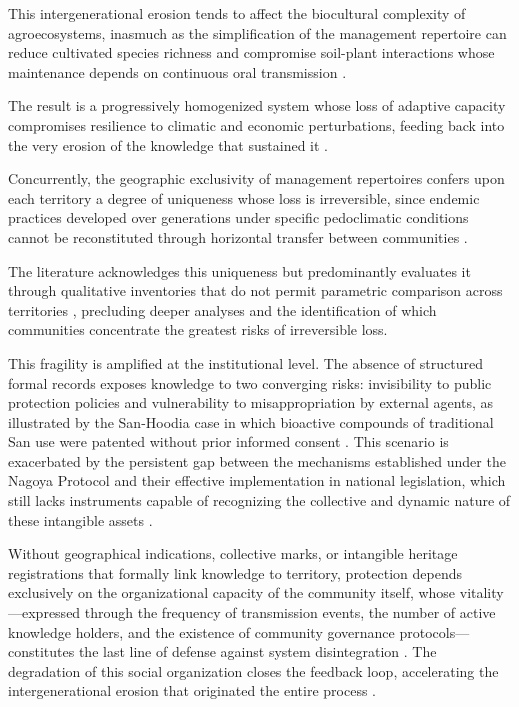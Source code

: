 \documentclass[12pt,a4paper]{article}
\begin{document}
This intergenerational erosion tends to affect the biocultural complexity of agroecosystems, inasmuch as the simplification of the management repertoire can reduce cultivated species richness and compromise soil-plant interactions whose maintenance depends on continuous oral transmission \citep{Brush2004,Bastos2022}.

The result is a progressively homogenized system whose loss of adaptive capacity compromises resilience to climatic and economic perturbations, feeding back into the very erosion of the knowledge that sustained it \citep{Aniah2019}.

Concurrently, the geographic exclusivity of management repertoires confers upon each territory a degree of uniqueness whose loss is irreversible, since endemic practices developed over generations under specific pedoclimatic conditions cannot be reconstituted through horizontal transfer between communities \citep{Laborde2023,Ens2016}.

The literature acknowledges this uniqueness but predominantly evaluates it through qualitative inventories that do not permit parametric comparison across territories \citep{CalvetMir2016,LaRosa2021,Saiba2023}, precluding deeper analyses and the identification of which communities concentrate the greatest risks of irreversible loss.

This fragility is amplified at the institutional level. The absence of structured formal records exposes knowledge to two converging risks: invisibility to public protection policies \citep{Santilli2009} and vulnerability to misappropriation by external agents, as illustrated by the San-Hoodia case in which bioactive compounds of traditional San use were patented without prior informed consent \citep{Wynberg2015}. This scenario is exacerbated by the persistent gap between the mechanisms established under the Nagoya Protocol and their effective implementation in national legislation, which still lacks instruments capable of recognizing the collective and dynamic nature of these intangible assets \citep{Laird2020}.

Without geographical indications, collective marks, or intangible heritage registrations that formally link knowledge to territory, protection depends exclusively on the organizational capacity of the community itself, whose vitality---expressed through the frequency of transmission events, the number of active knowledge holders, and the existence of community governance protocols---constitutes the last line of defense against system disintegration \citep{FalsBorda1991,Ostrom1990}. The degradation of this social organization closes the feedback loop, accelerating the intergenerational erosion that originated the entire process \citep{Agrawal2002}.
\end{document}
